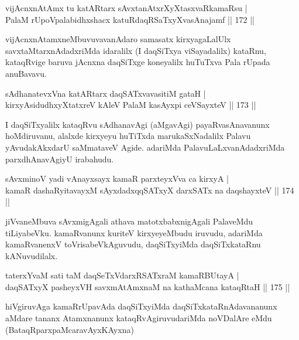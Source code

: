 
\begin{shl}
vijAcnxnAtAmx tu katAR\s tarx sAvxtanAtxrXyXtasxvaRkamaRsu |\\
PalaM rUpoVpalabidhxshacx katuRdaqRSaTxyXvasAnajamf \hfill || 172 ||
\end{shl}

\begin{artha}
vijAcnxnAtamxneMbuvuvavanAdaro samasatx kirxyagaLalUlx savxtaMtarxnAdadxriMda idaralilx (I daqSiTxya viSayadalilx) kataRnu, kataqRvige baruva jAcnxna daqSiTxge koneyalilx huTuTxva Pala rUpada anuBavavu.
\end{artha}

\begin{shl}
sAdhanatevxVna katAR\s tarx daqSATxvavasitiM gataH |\\
kirxyAsidudhxyXtatxreV kAleV PalaM kasAyxpi ceVSayxteV \hfill || 173 ||
\end{shl}

\begin{artha}
I daqSiTxyalilx kataqRvu sAdhanavAgi (aMgavAgi) payaRvasAnavanunx hoMdiruvanu, alalxde kirxyeyu huTiTxda marukaSxNadalilx Palavu yAvudakAkxdarU  saMmataveV Agide. adariMda PalavuLaLxvanAdadxriMda parxdhAnavAgiyU irabahudu.
\end{artha}


\begin{shl}
sAvxminoV yadi vA\s nayxsayx kamaR parxteyxVva ca kirxyA |\\
kamaR dashaRyitavayxM sAyxdadxqqSATxyX darxSATx na daqshayxteV \hfill || 174 ||
\end{shl}

\begin{artha}
jiVvaneMbuva sAvxmigAgali athava matotxbabxnigAgali PalaveMdu tiLiyabeVku. kamaRvanunx kuriteV kirxyeyeMbudu iruvudu, adariMda kamaRvanenxV toVrisabeVkAguvudu, daqSiTxyiMda daqSiTxkataRnu kANuvudilalx.
\end{artha}


\begin{shl}
taterxYvaM sati taM daqSeTxVdarxRSATxraM kamaRBUtayA |\\
daqSATxyX pasheyxVH savxmAtAmxnaM na kathaMcana kataqRtaH \hfill || 175 ||
\end{shl}

\begin{artha}
hiVgiruvAga kamaRrUpavAda daqSiTxyiMda daqSiTxkataRnAdavananunx aMdare tananx Atamxnanunx kataqRvAgiruvudariMda noVDalAre eMdu (BataqRparxpaMcaravAyxKAyxna)
\end{artha}

